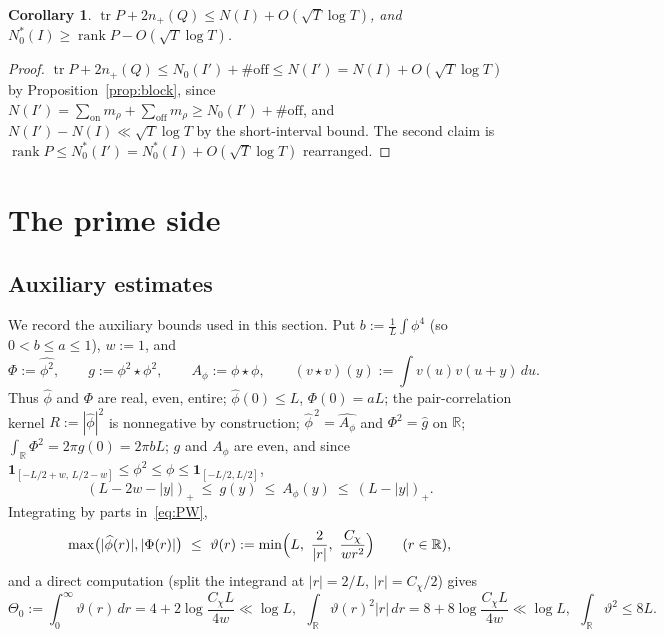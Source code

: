 \documentclass[11pt]{amsart}
\newtheorem{corollary}[theorem]{Corollary}
\theoremstyle{definition}
\theoremstyle{remark}
\numberwithin{equation}{section}
\DeclareMathOperator{\tr}{tr}
\DeclareMathOperator{\rank}{rank}
\newcommand{\RR}{\mathbb{R}}
\newcommand{\wh}{\widehat}
\newcommand{\npl}{n_{+}}
\newcommand{\one}{\mathbf 1}
\newcommand{\dd}{\,d}
\begin{document}
\begin{corollary}\label{cor:count}
$\tr P+2\npl(Q)\le N(I)+O(\sqrt T\log T)$, and $N_0^{*}(I)\ge\rank P-O(\sqrt T\log T)$.
\end{corollary}
\begin{proof}
$\tr P+2\npl(Q)\le N_0(I')+\#\mathrm{off}\le N(I')=N(I)+O(\sqrt T\log T)$ by Proposition~\ref{prop:block}, since $N(I')=\sum_{\mathrm{on}}m_\rho+\sum_{\mathrm{off}}m_\rho\ge N_0(I')+\#\mathrm{off}$, and $N(I')-N(I)\ll\sqrt T\log T$ by the short-interval bound. The second claim is $\rank P\le N_0^{*}(I')=N_0^{*}(I)+O(\sqrt T\log T)$ rearranged.
\end{proof}

\section{The prime side}\label{sec:prime}

\subsection{Auxiliary estimates}\label{subsec:aux}
We record the auxiliary bounds used in this section. Put $b:=\tfrac1L\int\phi^4$ (so $0<b\le a\le1$), $w:=1$, and
\begin{equation}\label{eq:PhigA}
\Phi:=\wh{\phi^2},\qquad g:=\phi^2\star\phi^2,\qquad A_\phi:=\phi\star\phi,\qquad (v\star v)(y):=\int v(u)v(u+y)\dd u .
\end{equation}
Thus $\wh\phi$ and $\Phi$ are real, even, entire; $\wh\phi(0)\le L$, $\Phi(0)=aL$; the pair-correlation kernel $R:=|\wh\phi|^2$ is nonnegative by construction; $\wh\phi^{\,2}=\wh{A_\phi}$ and $\Phi^2=\wh g$ on $\RR$; $\int_\RR\Phi^2=2\pi g(0)=2\pi bL$; $g$ and $A_\phi$ are even, and since $\one_{[-L/2+w,\,L/2-w]}\le\phi^2\le\phi\le\one_{[-L/2,L/2]}$,
\begin{equation}\label{eq:gbounds}
(L-2w-|y|)_+\ \le\ g(y)\ \le\ A_\phi(y)\ \le\ (L-|y|)_+ .
\end{equation}
Integrating by parts in~\eqref{eq:PW},
\begin{equation}\label{eq:thetadef}
\max\bigl(|\wh\phi(r)|,|\Phi(r)|\bigr)\ \le\ \vartheta(r):=\min\Bigl(L,\ \frac2{|r|},\ \frac{C_\chi}{w r^2}\Bigr)\qquad(r\in\RR),
\end{equation}
and a direct computation (split the integrand at $|r|=2/L$, $|r|=C_\chi/2$) gives
\begin{equation}\label{eq:thetaints}
\Theta_0:=\int_0^\infty\!\vartheta(r)\dd r=4+2\log\frac{C_\chi L}{4w}\ll\log L,\ \ \int_\RR\!\vartheta(r)^2|r|\dd r=8+8\log\frac{C_\chi L}{4w}\ll\log L,\ \ \int_\RR\!\vartheta^2\le 8L.
\end{equation}
\end{document}
